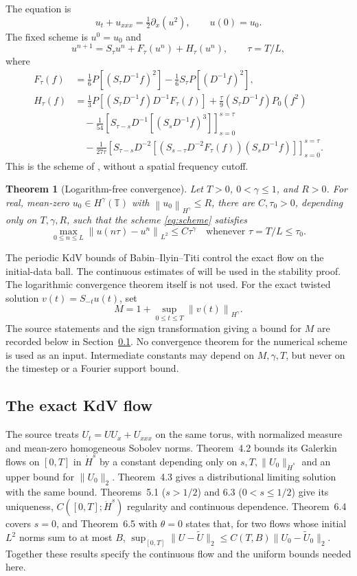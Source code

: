 \documentclass[11pt]{article}
\newtheorem{theorem}{Theorem}
\theoremstyle{remark}\newtheorem{remark}[theorem]{Remark}
\newcommand{\T}{\mathbb T}
\newcommand{\norm}[2][]{\left\lVert #2\right\rVert_{#1}}
\begin{document}
The equation is
\begin{equation}\label{eq:kdv}
u_t+u_{xxx}=\tfrac12\partial_x(u^2),\qquad u(0)=u_0.
\end{equation}
The fixed scheme is $u^0=u_0$ and
\begin{equation}\label{eq:scheme}
u^{n+1}=S_\tau u^n+F_\tau(u^n)+H_\tau(u^n),\qquad \tau=T/L,
\end{equation}
where
\begin{align*}
F_\tau(f)&=\tfrac16P[(S_\tau D^{-1}f)^2]-\tfrac16S_\tau P[(D^{-1}f)^2],\\
H_\tau(f)&=\tfrac13P[(S_\tau D^{-1}f)D^{-1}F_\tau(f)]
 +\tfrac\tau9(S_\tau D^{-1}f)P_0(f^2)\\
&\quad-\tfrac1{54}\left[S_{\tau-s}D^{-1}[(S_sD^{-1}f)^3]\right]_{s=0}^{s=\tau}\\
&\quad-\tfrac1{27\tau}\left[S_{\tau-s}D^{-2}
 [(S_{s-\tau}D^{-2}F_\tau(f))(S_sD^{-1}f)]\right]_{s=0}^{s=\tau}.
\end{align*}
This is the scheme of \cite[Eq.~(1.4)]{LW}, without a spatial frequency cutoff.

\begin{theorem}[Logarithm-free convergence]\label{thm:main}
Let $T>0$, $0<\gamma\leq1$, and $R>0$. For real, mean-zero
$u_0\in H^\gamma(\T)$ with $\norm[H^\gamma]{u_0}\leq R$, there are
$C,\tau_0>0$, depending only on $T,\gamma,R$, such that the scheme
\eqref{eq:scheme} satisfies
\[
\max_{0\leq n\leq L}\norm[L^2]{u(n\tau)-u^n}\leq C\tau^\gamma
\quad\text{whenever }\tau=T/L\leq\tau_0.
\]
\end{theorem}
The periodic KdV bounds of Babin--Ilyin--Titi control the exact flow on
the initial-data ball. The continuous estimates of
\cite[Proposition~3.4 and Lemma~7.2]{LW} will be used in the stability proof.
The logarithmic convergence theorem itself is not used.
For the exact twisted solution $v(t)=S_{-t}u(t)$, set
\[
M=1+\sup_{0\leq t\leq T}\norm[H^\gamma]{v(t)}.
\]
The source statements and the sign transformation giving a bound for $M$
are recorded below in Section~\ref{sec:flow}. No convergence theorem for the
numerical scheme is used as an input. Intermediate constants may depend on $M,\gamma,T$,
but never on the timestep or a Fourier support bound.

\subsection{The exact KdV flow}\label{sec:flow}
The source \cite[Theorems~4.2--4.3, 5.1, 6.3--6.5]{BIT} treats
$U_t=UU_x+U_{xxx}$ on the same torus, with normalized measure and
mean-zero homogeneous Sobolev norms. Theorem~4.2 bounds its Galerkin flows
on $[0,T]$ in $\dot H^s$ by a constant depending only on
$s,T,\|U_0\|_{\dot H^s}$ and an upper bound for $\|U_0\|_2$.
Theorem~4.3 gives a distributional limiting solution with the same bound.
Theorems~5.1 ($s>1/2$) and 6.3 ($0<s\leq1/2$) give its uniqueness,
$C([0,T];\dot H^s)$ regularity and continuous dependence. Theorem~6.4
covers $s=0$, and Theorem~6.5 with $\theta=0$ states that, for two flows
whose initial $L^2$ norms sum to at most $B$,
$\sup_{[0,T]}\|U-\widetilde U\|_2\leq C(T,B)\|U_0-\widetilde U_0\|_2$.
Together these results specify the continuous flow and the uniform
bounds needed here.
\end{document}
